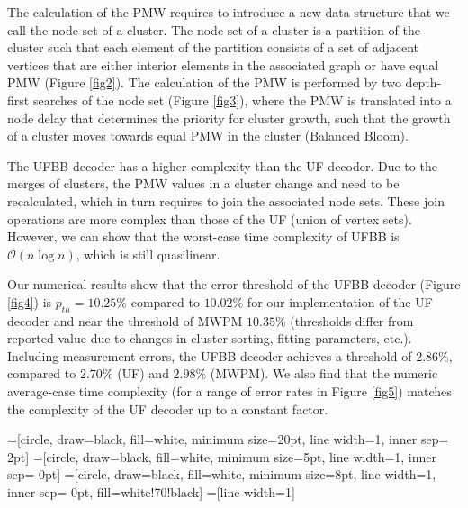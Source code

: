 \documentclass[11pt, a4paper, twoside, titlepage ,dvipsnames]{report}
\begin{document}
The calculation of the PMW requires to introduce a new data structure that we call the node set of a cluster. The node set of a cluster is a partition of the cluster such that each element of the partition consists of a set of adjacent vertices that are either interior elements in the associated graph or have equal PMW (Figure \ref{fig2}). The calculation of the PMW is performed by two depth-first searches of the node set (Figure \ref{fig3}), where the PMW is translated into a node delay that determines the priority for cluster growth, such that the growth of a cluster moves towards equal PMW in the cluster (Balanced Bloom).

The UFBB decoder has a higher complexity than the UF decoder. Due to the merges of clusters, the PMW values in a cluster change and need to be recalculated, which in turn requires to join the associated node sets. These join operations are more complex than those of the UF (union of vertex sets). However, we can show that the worst-case time complexity of UFBB is $\mathcal{O}(n \log n)$, which is still quasilinear.

Our numerical results show that the error threshold of the UFBB decoder (Figure \ref{fig4}) is $p_{th} = 10.25\%$ compared to $10.02\%$ for our implementation of the UF decoder and near the threshold of MWPM $10.35\%$ (thresholds differ from reported value due to changes in cluster sorting, fitting parameters, etc.). Including measurement errors, the UFBB decoder achieves a threshold of $2.86\%$, compared to $2.70\%$ (UF) and $2.98\%$ (MWPM). We also find that the numeric average-case time complexity (for a range of error rates in Figure \ref{fig5}) matches the complexity of the UF decoder up to a constant factor.

\vspace{1em}
\printbibliography[heading=none]

=[circle, draw=black, fill=white, minimum size=20pt, line width=1, inner sep= 2pt]
=[circle, draw=black, fill=white, minimum size=5pt, line width=1, inner sep= 0pt]
=[circle, draw=black, fill=white, minimum size=8pt, line width=1, inner sep= 0pt, fill=white!70!black]
=[line width=1]
\tikzfading[name=fade right, left color=transparent!0, right color=transparent!100]
\end{document}
